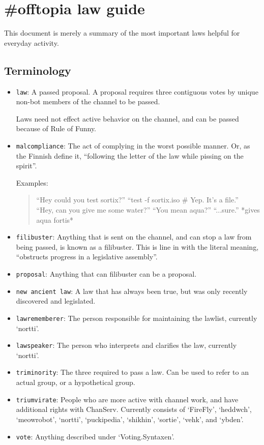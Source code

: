 \documentclass[11pt]{article}
\begin{document}
\section{\#offtopia law guide}

This document is merely a summary of the most important laws helpful for everyday activity.

\subsection{Terminology}

\begin{itemize}
\item \texttt{law}: A passed proposal. A proposal requires three contiguous votes
by unique non-bot members of the channel to be passed.

Laws need not effect active behavior on the channel, and can be passed because of
Rule of Funny.

\item \texttt{malcompliance}: The act of complying in the worst possible manner. Or,
as the Finnish define it, ``following the letter of the law while pissing on the spirit''.

Examples:
\begin{quote}
``Hey could you test sortix?'' ``test -f sortix.iso \# Yep. It's a file.'' \\
``Hey, can you give me some water?'' ``You mean aqua?'' ``...sure.'' *gives aqua fortis*
\end{quote}

\item \texttt{filibuster}: Anything that is sent on the channel, and can stop a
law from being passed, is known as a filibuster. This is line in with the literal meaning, ``obstructs progress in a legislative assembly''.

\item \texttt{proposal}: Anything that can filibuster can be a proposal.

\item \texttt{new ancient law}: A law that has always been true, 
but was only recently discovered and legislated.

\item \texttt{lawrememberer}: The person responsible for maintaining the lawlist,
currently `nortti'.

\item \texttt{lawspeaker}: The person who interprets and clarifies the law,
currently `nortti'.

\item \texttt{triminority}: The three required to pass a law. Can be used to refer to
an actual group, or a hypothetical group.

\item \texttt{triumvirate}: People who are more active with channel work, and have additional rights with ChanServ. Currently consists of `FireFly', `heddwch', `meowrobot', `nortti', `puckipedia', `shikhin', `sortie', `vehk', and `ybden'.

\item \texttt{vote}: Anything described under `Voting.Syntaxen'.
\end{itemize}
\end{document}
